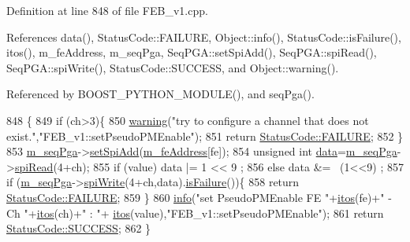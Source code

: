 Definition at line 848 of file F\+E\+B\+\_\+v1.\+cpp.



References data(), Status\+Code\+::\+F\+A\+I\+L\+U\+RE, Object\+::info(), Status\+Code\+::is\+Failure(), itos(), m\+\_\+fe\+Address, m\+\_\+seq\+Pga, Seq\+P\+G\+A\+::set\+Spi\+Add(), Seq\+P\+G\+A\+::spi\+Read(), Seq\+P\+G\+A\+::spi\+Write(), Status\+Code\+::\+S\+U\+C\+C\+E\+SS, and Object\+::warning().



Referenced by B\+O\+O\+S\+T\+\_\+\+P\+Y\+T\+H\+O\+N\+\_\+\+M\+O\+D\+U\+L\+E(), and seq\+Pga().


\begin{DoxyCode}
848                                                                 \{
849   \textcolor{keywordflow}{if} (ch>3)\{
850     \hyperlink{classObject_a65cd4fda577711660821fd2cd5a3b4c9}{warning}(\textcolor{stringliteral}{"try to configure a channel that does not exist."},\textcolor{stringliteral}{"FEB\_v1::setPseudoPMEnable"});
851     \textcolor{keywordflow}{return} \hyperlink{classStatusCode_a6f565cbeadc76d14c72f047e5e85eb4ba3da73d4c469762eb9d3c960368252b26}{StatusCode::FAILURE};
852   \}
853   \hyperlink{classFEB__v1_a6c7804ac86796f233a8393043adf2e77}{m\_seqPga}->\hyperlink{classSeqPGA_ac998ce3a6d9b5f2e88cc8393f8c1df53}{setSpiAdd}(\hyperlink{classFEB__v1_a4e1945c2d5b434125f375e9d0fc6d99f}{m\_feAddress}[fe]);
854   \textcolor{keywordtype}{unsigned} \textcolor{keywordtype}{int} \hyperlink{classFEB__v1_a6bca4320bd3bbbc32efc81097f33421a}{data}=\hyperlink{classFEB__v1_a6c7804ac86796f233a8393043adf2e77}{m\_seqPga}->\hyperlink{classSeqPGA_ab3d0e5e5d4014bc7a92588a76b8713d4}{spiRead}(4+ch);
855   \textcolor{keywordflow}{if} (value)  data |= 1 << 9 ;
856   \textcolor{keywordflow}{else}        data &= ~(1<<9) ;
857   \textcolor{keywordflow}{if} (\hyperlink{classFEB__v1_a6c7804ac86796f233a8393043adf2e77}{m\_seqPga}->\hyperlink{classSeqPGA_ad4421841ce4ce8b88ad13f63216f0743}{spiWrite}(4+ch,data).\hyperlink{classStatusCode_a5dd22dc6eb2c52fc4cabc58f6dea2eb7}{isFailure}())\{
858     \textcolor{keywordflow}{return} \hyperlink{classStatusCode_a6f565cbeadc76d14c72f047e5e85eb4ba3da73d4c469762eb9d3c960368252b26}{StatusCode::FAILURE};
859   \}
860   \hyperlink{classObject_a644fd329ea4cb85f54fa6846484b84a8}{info}(\textcolor{stringliteral}{"set PseudoPMEnable FE "}+\hyperlink{Tools_8h_af330027dbdafb9a30768b3613c553e60}{itos}(fe)+\textcolor{stringliteral}{" - Ch "}+\hyperlink{Tools_8h_af330027dbdafb9a30768b3613c553e60}{itos}(ch)+\textcolor{stringliteral}{" : "}+
      \hyperlink{Tools_8h_af330027dbdafb9a30768b3613c553e60}{itos}(value),\textcolor{stringliteral}{"FEB\_v1::setPseudoPMEnable"});
861   \textcolor{keywordflow}{return} \hyperlink{classStatusCode_a6f565cbeadc76d14c72f047e5e85eb4badd0da38d3ba0d922efd1f4619bc37ad8}{StatusCode::SUCCESS};
862 \}
\end{DoxyCode}
\mbox{\label{classFEB__v1_ae8e531b961f91ac974a75c43937acf78}} 
